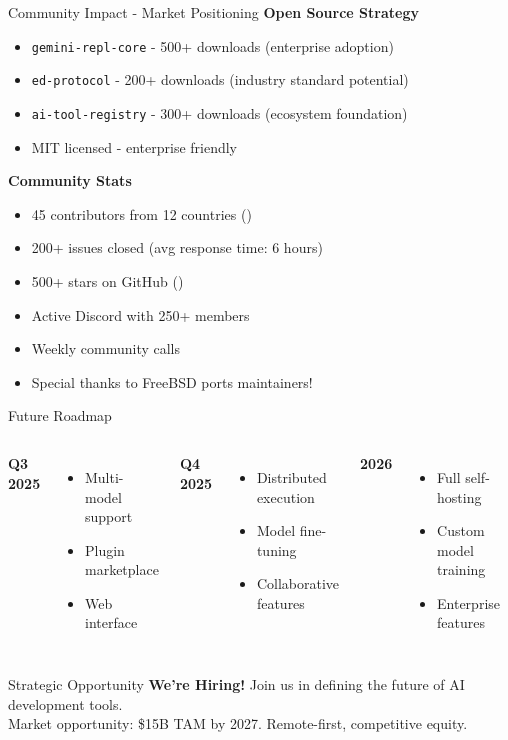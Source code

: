 \documentclass[aspectratio=169]{beamer}
\begin{document}
\begin{frame}{Community Impact - Market Positioning}
\textbf{Open Source Strategy}
\begin{itemize}
\item \texttt{gemini-repl-core} - 500+ downloads (enterprise adoption)
\item \texttt{ed-protocol} - 200+ downloads (industry standard potential)
\item \texttt{ai-tool-registry} - 300+ downloads (ecosystem foundation)
\item MIT licensed - enterprise friendly
\end{itemize}

\textbf{Community Stats}
\begin{itemize}
\item 45 contributors from 12 countries (\faGlobe)
\item 200+ issues closed (avg response time: 6 hours)
\item 500+ stars on GitHub (\faStar)
\item Active Discord with 250+ members
\item Weekly community calls
\item Special thanks to FreeBSD ports maintainers!
\end{itemize}
\end{frame}

\begin{frame}{Future Roadmap}
\begin{columns}
\textbf{Q3 2025}
\begin{itemize}
\item Multi-model support
\item Plugin marketplace
\item Web interface
\end{itemize}

\textbf{Q4 2025}
\begin{itemize}
\item Distributed execution
\item Model fine-tuning
\item Collaborative features
\end{itemize}

\textbf{2026}
\begin{itemize}
\item Full self-hosting
\item Custom model training
\item Enterprise features
\end{itemize}
\end{columns}

\begin{alertblock}{Strategic Opportunity}
\textbf{We're Hiring!} Join us in defining the future of AI development tools.\\Market opportunity: \$15B TAM by 2027. Remote-first, competitive equity.
\end{alertblock}
\end{frame}
\end{document}
